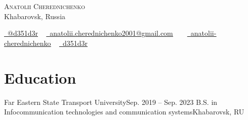 






\begin{center}
    {\Huge \scshape Anatolii Cherednichenko} \\ \vspace{1pt}
    Khabarovsk, Russia \\ \vspace{1pt}
    \vspace{1pt}
    
    \href{https://t.me/d351d3r/}{\raisebox{-0.2\height}\faTelegram\ \underline{@d351d3r}}  ~
    \href{mailto:anatolii.cherednichenko2001@gmail.com
}{\raisebox{-0.2\height}\faEnvelope\  \underline{anatolii.cherednichenko2001@gmail.com}} ~ \small \raisebox{-0.1\height}~%
    \href{https://linkedin.com/in/anatolii-cherednichenko/}{\raisebox{-0.2\height}\faLinkedin\ \underline{anatolii-cherednichenko}}  ~
    \href{https://github.com/d351d3r}{\raisebox{-0.2\height}\faGithub\ \underline{d351d3r}}

    \vspace{-8pt}
\end{center}

\section{Education}
  \resumeSubHeadingListStart
    \resumeSubheading
      {Far Eastern State Transport University}{Sep. 2019 -- Sep. 2023}
      {B.S. in Infocommunication technologies and communication systems}{Khabarovsk, RU}
  \resumeSubHeadingListEnd

